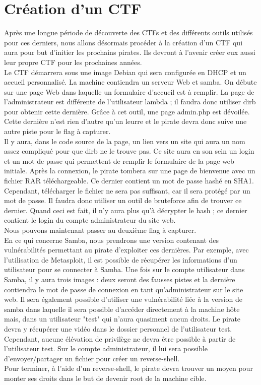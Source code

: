 \chapter{Création d'un CTF}
\label{chap:BDD}

Après une longue période de découverte des CTFs et des différents outils utilisés pour ces derniers, nous allons désormais procéder à la création d’un CTF qui aura pour but d’initier les prochains pirates. Ils devront à l’avenir créer eux aussi leur propre CTF pour les prochaines années. \\

    
	Le CTF démarrera sous une image Debian qui sera configurée en DHCP et un accueil personnalisé. La machine contiendra un serveur Web et samba. On débute sur une page Web dans laquelle un formulaire d’accueil est à remplir. La page de l'administrateur est différente de l'utilisateur lambda ; il faudra donc utiliser dirb pour obtenir cette dernière.
	Grâce à cet outil, une page admin.php est dévoilée. Cette dernière n'est rien d'autre qu'un leurre et le pirate devra donc suive une autre piste pour le flag à capturer. \\
Il y aura, dans le code source de la page, un lien vers un site qui aura un nom assez compliqué pour que dirb ne le trouve pas. Ce site aura en son sein un login et un mot de passe qui permettent de remplir le formulaire de la page web initiale. 
Après la connexion, le pirate tombera sur une page de bienvenue avec un fichier RAR téléchargeable. Ce dernier contient un mot de passe hashé en SHA1.
Cependant, télécharger le fichier ne sera pas suffisant, car il sera protégé par un mot de passe. Il faudra donc utiliser un outil de bruteforce afin de trouver ce dernier.
Quand ceci est fait, il n'y aura plus qu'à décrypter le hash ; ce dernier contient le login du compte administrateur du site web.\\

\noindent Nous pouvons maintenant passer au deuxième flag à capturer. \\

En ce qui concerne Samba, nous prendrons une version contenant des vulnérabilités permettant au pirate d’exploiter ces dernières. Par exemple, avec l’utilisation de Metasploit, il est possible de récupérer les informations d’un utilisateur pour se connecter à Samba. 
Une fois sur le compte utilisateur dans Samba, il y aura trois images : deux seront des fausses pistes et la dernière contiendra le mot de passe de connexion en tant qu’administrateur sur le site web. Il sera également possible d'utiliser une vulnérabilité liée à la version de samba dans laquelle il sera possible d'accéder directement à la machine hôte mais, dans un utilisateur "test" qui n'aura quasiment aucun droits. Le pirate devra y récupérer une vidéo dans le dossier personnel de l'utilisateur test. Cependant, aucune élévation de privilège ne devra être possible à partir de l'utilisateur test.
Sur le compte administrateur, il lui sera possible d’envoyer/partager un fichier pour créer un reverse-shell. \\
	
Pour terminer, à l’aide d’un reverse-shell, le pirate devra trouver un moyen pour monter ses droits dans le but de devenir root de la machine cible.\\
